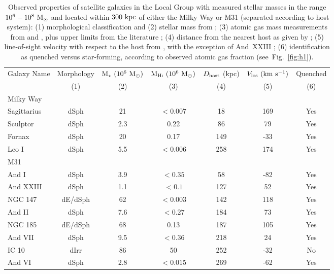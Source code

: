 \begin{table}
\centering 
\begin{tabular}{l c c c c c c } 
  \hline\hline 
  Galaxy Name & Morphology & ${\rm M}_{\star}~(10^{6}~{\rm M}_{\odot})$ &
  ${\rm M}_{\rm H{\textsc{\tiny I}}}~(10^{6}~{\rm M}_{\odot})$ & $D_{\rm host}$ (kpc) &
  $V_{\rm los}~({\rm km}~{\rm s}^{-1})$ & Quenched \\
  & (1) & (2) & (3) & (4) & (5) & (6) \\
  \hline\hline
  Milky Way &  & & & & & \\
  \hline
Sagittarius & dSph & 21 & $< 0.007$ & 18 & 169 & Yes \\
Sculptor & dSph & 2.3 & 0.22 & 86 & 79 & Yes \\
Fornax & dSph & 20 & 0.17 & 149 & -33 & Yes \\
Leo I & dSph & 5.5 & $< 0.006$ & 258 & 174 & Yes \\
\hline
M31 &   & & & & & \\
\hline
And I & dSph & 3.9 & $< 0.35$ & 58 & -82 & Yes \\
And XXIII & dSph & 1.1 & $<0.1$ & 127 & 52 & Yes \\
NGC 147 & dE/dSph & 62 & $< 0.003$ & 142 & 118 & Yes \\
And II & dSph & 7.6 & $< 0.27$ & 184 & 73 & Yes \\
NGC 185 & dE/dSph & 68 & 0.13 & 187 & 105 & Yes \\
And VII & dSph & 9.5 & $< 0.36$ & 218 & 24 & Yes \\
IC 10 & dIrr & 86 & 50 & 252 & -32 & No \\
And VI & dSph & 2.8 & $< 0.015$ & 269 & -62 & Yes \\
\hline 
\hline
\end{tabular} 
\label{table:dwarfs} 
\caption{Observed properties of satellite galaxies in the Local Group
  with measured stellar masses in the range $10^{6}-10^{8}~{\rm M}_{\odot}$ and
  located within $300~{\rm kpc}$ of either the Milky Way or M31 (separated
  according to host system):  
  (1) morphological classification and (2)
  stellar mass from \citet{mcconnachie12}; (3)
  atomic gas mass measurements from \citet{mcconnachie12} and
  \citet{grcevich09}, plus upper limits from the literature
  \citep{burton99, grcevich09, huang12a, giovanelli13};
  (4) distance from the nearest host as given by \citet{mcconnachie12};   
  (5) line-of-sight velocity with respect to the host from
  \citet{mcconnachie12}, with the exception of And~XXIII 
  \citep{kirby14}; (6) identification as quenched 
  versus star-forming, according to observed atomic gas fraction
  (see~Fig.~\ref{fig:h1}). } 
\end{table} 




